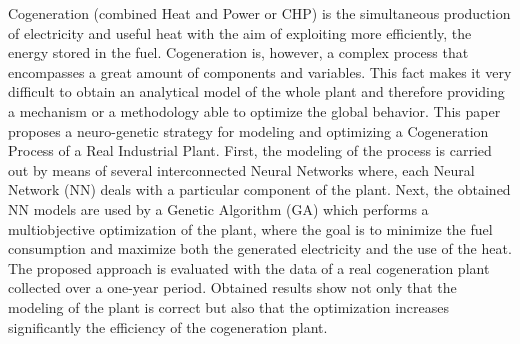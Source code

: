 Cogeneration (combined Heat and Power or CHP) is the simultaneous production of electricity and useful heat with the aim of exploiting more efficiently, the energy stored in the fuel. Cogeneration is, however, a complex process that encompasses a great amount of components and variables. This fact makes it very difficult to obtain an analytical model of the whole plant and therefore providing a mechanism or a methodology able to optimize the global behavior. This paper proposes a neuro-genetic strategy for modeling and optimizing a Cogeneration Process of a Real Industrial Plant. First, the modeling of the process is carried out by means of several interconnected Neural Networks where, each Neural Network (NN) deals with a particular component of the plant. Next, the obtained NN models are used by a Genetic Algorithm (GA) which performs a multiobjective optimization of the plant, where the goal is to minimize the fuel consumption and maximize both the generated electricity and the use of the heat. The proposed approach is evaluated with the data of a real cogeneration plant collected over a one-year period. Obtained results show not only that the modeling of the plant is correct but also that the optimization increases significantly the efficiency of the cogeneration plant.